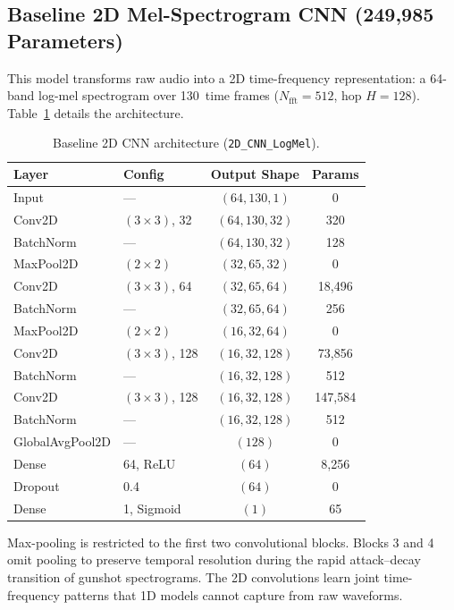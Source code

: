 \documentclass[conference]{IEEEtran}
\begin{document}
\subsection{Baseline 2D Mel-Spectrogram CNN (249{,}985 Parameters)}
This model transforms raw audio into a 2D time-frequency representation: a 64-band log-mel spectrogram over 130~time frames ($N_{\text{fft}} = 512$, hop $H = 128$). Table~\ref{tab:arch_2d} details the architecture.

\begin{table}[!t]
\centering
\caption{Baseline 2D CNN architecture (\texttt{2D\_CNN\_LogMel}).}
\label{tab:arch_2d}
\footnotesize
\begin{tabular}{llcc}
\toprule
\textbf{Layer} & \textbf{Config} & \textbf{Output Shape} & \textbf{Params} \\
\midrule
Input & --- & $(64, 130, 1)$ & 0 \\
Conv2D & $(3\!\times\!3)$, 32 & $(64, 130, 32)$ & 320 \\
BatchNorm & --- & $(64, 130, 32)$ & 128 \\
MaxPool2D & $(2\!\times\!2)$ & $(32, 65, 32)$ & 0 \\
Conv2D & $(3\!\times\!3)$, 64 & $(32, 65, 64)$ & 18{,}496 \\
BatchNorm & --- & $(32, 65, 64)$ & 256 \\
MaxPool2D & $(2\!\times\!2)$ & $(16, 32, 64)$ & 0 \\
Conv2D & $(3\!\times\!3)$, 128 & $(16, 32, 128)$ & 73{,}856 \\
BatchNorm & --- & $(16, 32, 128)$ & 512 \\
Conv2D & $(3\!\times\!3)$, 128 & $(16, 32, 128)$ & 147{,}584 \\
BatchNorm & --- & $(16, 32, 128)$ & 512 \\
GlobalAvgPool2D & --- & $(128)$ & 0 \\
Dense & 64, ReLU & $(64)$ & 8{,}256 \\
Dropout & 0.4 & $(64)$ & 0 \\
Dense & 1, Sigmoid & $(1)$ & 65 \\
\bottomrule
\end{tabular}
\end{table}

Max-pooling is restricted to the first two convolutional blocks. Blocks 3 and 4 omit pooling to preserve temporal resolution during the rapid attack--decay transition of gunshot spectrograms. The 2D convolutions learn joint time-frequency patterns that 1D models cannot capture from raw waveforms.
\end{document}
